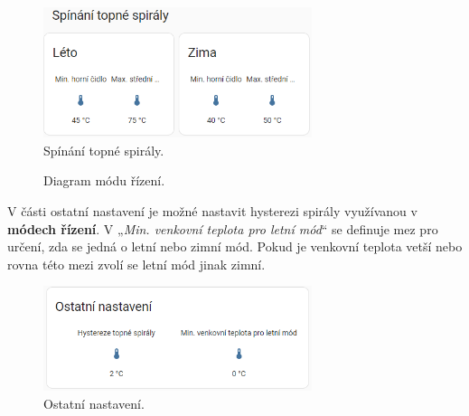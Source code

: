 \begin{Czech}
\begin{figure}[H]
    \centering
    \includegraphics[width=0.7\textwidth]{pictures/czech/software/switching-heating-coil.png}
    \caption{Spínání topné spirály.}
    \label{fig:switching-heating-coil}
\end{figure}
\end{Czech}

\begin{Czech}
\begin{figure}[H]
    \centering
    \def\svgwidth{1\columnwidth}
    \graphicspath{{pictures/czech/software/svg/}}
    
    \caption{Diagram módu řízení.}
    \label{fig:diagram-control-modes}
\end{figure}
\end{Czech}


\begin{Czech}
\end{Czech}

\begin{Czech}
V části ostatní nastavení je možné nastavit hysterezi spirály využívanou v \textbf{módech řízení}. V „\textit{Min. venkovní teplota pro letní mód}“ se definuje mez pro určení, zda se jedná o letní nebo zimní mód. Pokud je venkovní teplota vetší nebo rovna této mezi zvolí se letní mód jinak zimní.
\end{Czech}

\begin{Czech}
\begin{figure}[H]
    \centering
    \includegraphics[width=0.7\textwidth]{pictures/czech/software/other-settings.png}
    \caption{Ostatní nastavení.}
    \label{fig:other-settings}
\end{figure}
\end{Czech}

